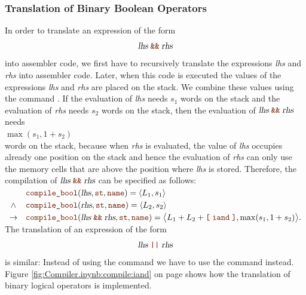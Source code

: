 \subsubsection{Translation of Binary Boolean Operators}
In order to translate an expression of the form
\[ \textsl{lhs} \;\mytt{\&\&}\; \textsl{rhs} \]
into assembler code, we first have to recursively translate the expressions \textsl{lhs} and
\textsl{rhs} into assembler code.  Later, when this code is executed the values of the expressions
\textsl{lhs} and \textsl{rhs} are placed on the stack.  We combine these values using the command .
If the evaluation of \textsl{lhs} needs $s_1$ words on the stack and the evaluation of \textsl{rhs} needs $s_2$
words on the stack, then the evaluation of $\textsl{lhs} \;\mytt{\&\&}\; \textsl{rhs}$ needs 
\\[0.2cm]
\hspace*{1.3cm}
$\max(s_1, 1 + s_2)$
\\[0.2cm]
words on the stack, because when \textsl{rhs} is evaluated, the value of \textsl{lhs} occupies already one position
on the stack and hence the evaluation of \textsl{rhs} can only use the memory cells that are above the position
where \textsl{lhs} is stored. Therefore, the compilation of $\textsl{lhs} \;\mytt{\&\&}\; \textsl{rhs}$ can be
specified as follows:
\\[0.2cm]
\hspace*{1.3cm}
$
\begin{array}[t]{cll}
        & \mytt{compile\_bool}(\textsl{lhs}, \mytt{st}, \mytt{name}) = \pair(L_1, s_1)  \\[0.1cm]
\wedge  & \mytt{compile\_bool}(\textsl{rhs}, \mytt{st}, \mytt{name}) = \pair(L_2, s_2)  \\[0.1cm]
\rightarrow & \mytt{compile\_bool}(\textsl{lhs} \;\mytt{\&\&}\; \textsl{rhs}, \mytt{st}, \mytt{name}) = 
            \bigl\langle L_1 + L_2 + \mytt{[}\; \mytt{iand} \;\mytt{]}, \max(s_1, 1+s_2) \bigr\rangle.
\end{array}$
\\[0.2cm]
The translation of an expression of the form
\[ \textsl{lhs} \;\mytt{||}\; \textsl{rhs} \]
is similar:  Instead of using the command  we have to use the command  instead.
Figure \ref{fig:Compiler.ipynb:compile:iand} on page \pageref{fig:Compiler.ipynb:compile:iand} shows how the
translation of binary logical operators is implemented.

